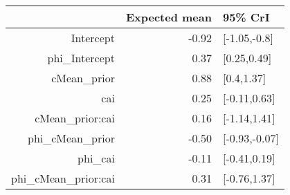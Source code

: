 \begin{tabular}{rrl}
  \hline
 & Expected mean & 95\% CrI \\ 
  \hline
Intercept & -0.92 & [-1.05,-0.8] \\ 
  phi\_Intercept & 0.37 & [0.25,0.49] \\ 
  cMean\_prior & 0.88 & [0.4,1.37] \\ 
  cai & 0.25 & [-0.11,0.63] \\ 
  cMean\_prior:cai & 0.16 & [-1.14,1.41] \\ 
  phi\_cMean\_prior & -0.50 & [-0.93,-0.07] \\ 
  phi\_cai & -0.11 & [-0.41,0.19] \\ 
  phi\_cMean\_prior:cai & 0.31 & [-0.76,1.37] \\ 
   \hline
\end{tabular}

